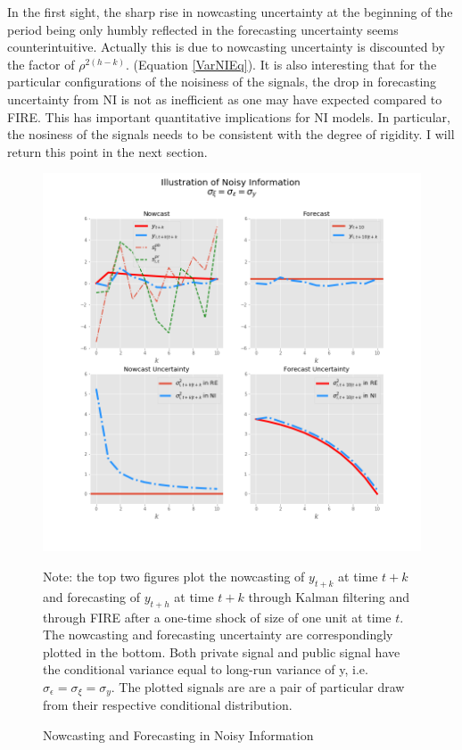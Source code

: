 \documentclass[12pt]{article}
\begin{document}
	In the first sight, the sharp rise in nowcasting uncertainty at the beginning of the period being only humbly reflected in the forecasting uncertainty seems counterintuitive. Actually this is due to nowcasting uncertainty is discounted by the factor of $\rho^{2(h-k)}$.  (Equation \ref{VarNIEq}). It is also interesting that for the particular configurations of the noisiness of the signals, the drop in forecasting uncertainty from NI is not as inefficient as one may have expected compared to FIRE.  This has important quantitative implications for NI models. In particular, the nosiness of the signals needs to be consistent with the degree of rigidity. I will return this point in the next section.  
	
	\begin{figure}[ht]
		\centering
		\includegraphics[width=13cm]{figures/ni_illustration.png}  \\
		\begin{flushleft}
		{\footnotesize Note: the top two figures plot the nowcasting of $y_{t+k}$  at time $t+k$ and forecasting of $y_{t+h}$ at time $t+k$ through Kalman filtering and through FIRE after a one-time shock of size of one unit at time $t$. The nowcasting and forecasting uncertainty are correspondingly plotted in the bottom. Both private signal and public signal have the conditional variance equal to long-run variance of y, i.e.  $\sigma_\epsilon = \sigma_\xi = \sigma_y$. The plotted signals are are a pair of particular draw from their respective conditional distribution. }
		\end{flushleft}
		\caption{Nowcasting and Forecasting in Noisy Information}
		\label{IllustrateNI}
	\end{figure}
	
\end{document}
